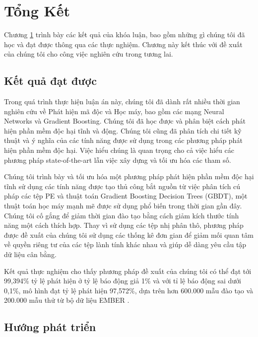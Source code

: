 \chapter{Tổng Kết} 
\label{chap:conclusion}

\begin{chapabstract}
Chương \ref{chap:conclusion} trình bày các kết quả của khóa luận, bao gồm những gì chúng tôi đã học và đạt được thông qua các thực nghiệm. Chương này kết thúc với đề xuất của chúng tôi cho công việc nghiên cứu trong tương lai.
\end{chapabstract}

\section{Kết quả đạt được}

Trong quá trình thực hiện luận án này, chúng tôi đã dành rất nhiều thời gian nghiên cứu về Phát hiện mã độc và Học máy, bao gồm các mạng Neural Networks và Gradient Boosting.
Chúng tôi đã học được và phân biệt cách phát hiện phần mềm độc hại tĩnh và động.
Chúng tôi cũng đã phân tích chi tiết kỹ thuật và ý nghĩa của các tính năng được sử dụng trong các phương pháp phát hiện phần mềm độc hại.
Việc hiểu chúng là quan trọng cho cả việc hiểu các phương pháp state-of-the-art lẫn việc xây dựng và tối ưu hóa các tham số.

Chúng tôi trình bày và tối ưu hóa một phương pháp phát hiện phần mềm độc hại tĩnh sử dụng các tính năng được tạo thủ công bắt nguồn từ việc phân tích cú pháp các tệp PE và thuật toán Gradient Boosting Decision Trees (GBDT), một thuật toán học máy mạnh mẽ được sử dụng phổ biến trong thời gian gần đây.
Chúng tôi cố gắng để giảm thời gian đào tạo bằng cách giảm kích thước tính năng một cách thích hợp.
Thay vì sử dụng các tệp nhị phân thô, phương pháp được đề xuất của chúng tôi sử dụng các thống kê đơn gian để giảm mối quan tâm về quyền riêng tư của các tệp lành tính khác nhau và giúp dễ dàng yêu cầu tập dữ liệu cân bằng.

Kết quả thực nghiệm cho thấy phương pháp đề xuất của chúng tôi có thể đạt tới 99,394\% tỷ lệ phát hiện ở tỷ lệ báo động giả 1\% và với tỉ lệ báo động sai dưới 0,1\%, mô hình đạt tỷ lệ phát hiện 97,572\%, dựa trên hơn 600.000 mẫu đào tạo và 200.000 mẫu thử từ bộ dữ liệu EMBER \cite{anderson2018ember}.

\section{Hướng phát triển}

